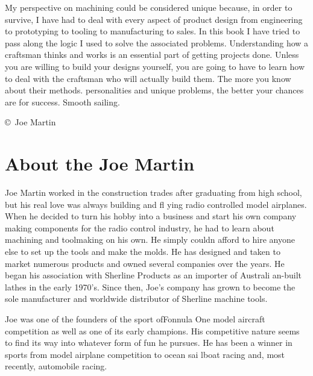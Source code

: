 My perspective on machining could be considered
unique because, in order to survive, I have had to
deal with every aspect of product design from
engineering to prototyping to tooling to
manufacturing to sales. In this book I have tried to
pass along the logic I used to solve the associated
problems. Understanding how a craftsman thinks
and works is an essential part of getting projects
done. Unless you are willing to build your designs
yourself, you are going to have to learn how to deal
with the craftsman who will actually build them.
The more you know about their methods.
personalities and unique problems, the better your
chances are for success. Smooth sailing.

\bigskip\copyright\ Joe Martin

\chapter{About the Joe Martin}

Joe Martin worked in the construction trades after graduating from high school,
but his real love was always building and fl ying radio controlled model
airplanes. When he decided to turn his hobby into a business and start his own
company making components for the radio control industry, he had to learn about
machining and toolmaking on his own. He simply couldn afford to hire anyone else
to set up the tools and make the molds. He has designed and taken to market
numerous products and owned several companies over the years. He began his
association with Sherline Products as an importer of Australi an-built lathes in
the early 1970's. Since then, Joe's company has grown to become the sole
manufacturer and worldwide distributor of Sherline machine tools.

Joe was one of the founders of the sport ofFonnula One model aircraft
competition as well as one of its early champions. His competitive nature seems
to find its way into whatever form of fun he pursues. He has been a winner in
sports from model airplane competition to ocean sai lboat racing and, most
recently, automobile racing.

